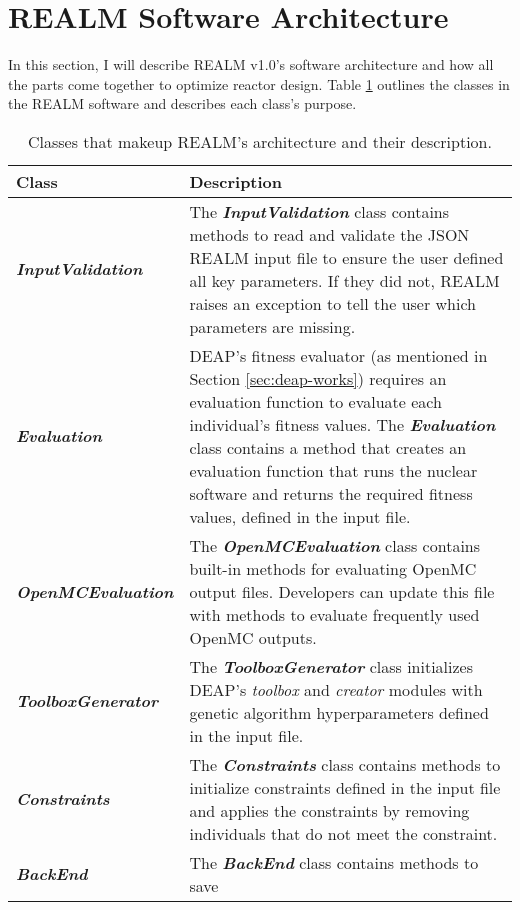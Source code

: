 \section{REALM Software Architecture}
In this section, I will describe \gls{REALM} v1.0's software architecture and 
how all the parts come together to optimize reactor design. 
Table \ref{tab:realm-architecture} outlines the classes in the REALM software 
and describes each class's purpose.
\begin{table}[]
    \centering
    \onehalfspacing
    \caption{Classes that makeup REALM's architecture and their description. }
	\label{tab:realm-architecture}
    \footnotesize
    \begin{tabular}{l|p{}}
    \hline
    \textbf{Class} & \textbf{Description} \\ \hline
    \textbf{\textit{InputValidation}} & The \textbf{\textit{InputValidation}} class contains methods 
    to read and validate the JSON \gls{REALM} input file to 
    ensure the user defined all key parameters. If they did not, \gls{REALM} 
    raises an exception to tell the user which parameters are missing. \\
    \hline
    \textbf{\textit{Evaluation}} & \gls{DEAP}'s fitness evaluator (as mentioned in Section 
    \ref{sec:deap-works}) requires an evaluation function to evaluate each 
    individual's fitness values. 
    The \textbf{\textit{Evaluation}} class contains a method that creates an evaluation 
    function that runs the nuclear software and returns the required fitness values, 
    defined in the input file. \\
    \hline 
    \textbf{\textit{OpenMCEvaluation}} & The \textbf{\textit{OpenMCEvaluation}} class contains
    built-in methods for evaluating OpenMC output files. Developers can update 
    this file with methods to evaluate frequently used OpenMC outputs. \\
    \hline 
    \textbf{\textit{ToolboxGenerator}} & The \textbf{\textit{ToolboxGenerator}} class initializes
    DEAP's \textit{toolbox} and \textit{creator} modules with genetic algorithm 
    hyperparameters defined in the input file.\\
    \hline
    \textbf{\textit{Constraints}} & The \textbf{\textit{Constraints}} class 
    contains methods to initialize constraints defined in the input file 
    and applies the constraints by removing individuals that do not meet the 
    constraint.\\
    \hline 
    \textbf{\textit{BackEnd}} & The \textbf{\textit{BackEnd}} class contains methods to save 

\end{tabular}
\end{table}
